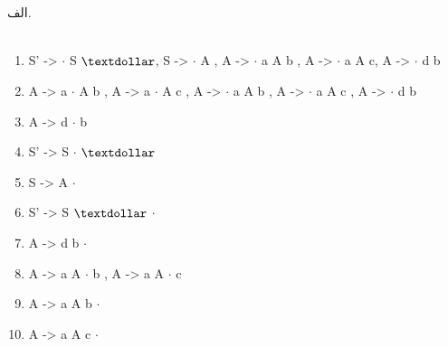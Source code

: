 
\\
\\
الف.
\\
\\
\begin{latin}
\begin{enumerate}
    \item 
    S' -> {$\cdot$} S {$\textdollar$}, S -> {$\cdot$} A , A -> {$\cdot$} a A b , A -> {$\cdot$} a A c, A -> {$\cdot$} d b
    \item
    A -> a {$\cdot$} A b , A -> a {$\cdot$} A c , A -> {$\cdot$} a A b , A -> {$\cdot$} a A c , A -> {$\cdot$} d b
    \item
    A -> d {$\cdot$} b
    \item
    S' -> S {$\cdot$} {$\textdollar$}
    \item
    S -> A {$\cdot$}
    \item
    S' -> S {$\textdollar$} {$\cdot$}
    \item
    A -> d b {$\cdot$}
    \item
    A -> a A {$\cdot$} b , A -> a A {$\cdot$} c
    \item
    A -> a A b {$\cdot$}
    \item
    A -> a A c {$\cdot$}
\end{enumerate}
\end{latin}

